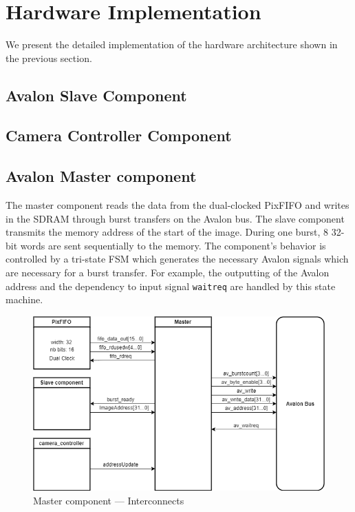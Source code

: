 \documentclass{article}
\begin{document}
\section{Hardware Implementation}

We present the detailed implementation of the hardware architecture shown in the previous section. 

\subsection{Avalon Slave Component}

\subsection{Camera Controller Component}
\subsection{Avalon Master component}

The master component reads the data from the dual-clocked PixFIFO and writes in the SDRAM through burst transfers on the Avalon bus. The slave component transmits the memory address of the start of the image. During one burst, 8 32-bit words are sent sequentially to the memory. The component's behavior is controlled by a tri-state FSM which generates the necessary Avalon signals which are necessary for a burst transfer. For example, the outputting of the Avalon address and the dependency to input signal \verb'waitreq' are handled by this state machine. 

\begin{figure}[H]
\centering
\includegraphics[scale=0.6]{images/MasterGeneral.png}
\caption{Master component --- Interconnects}
\label{fig:MasterGeneral}
\end{figure}
\end{document}
